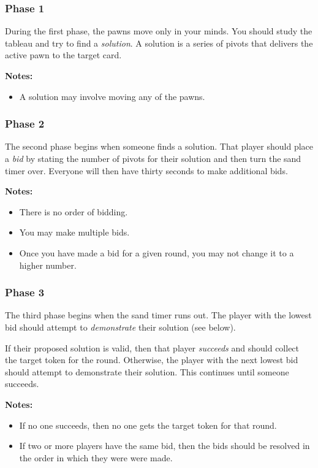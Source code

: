 \documentclass[a6paper, parskip=half, DIV=14, 10pt]{scrartcl}
\begin{document}
\subsubsection*{Phase 1}
During the first phase, the pawns move only in your minds. You should study the tableau and try to find a \emph{solution}. A solution is a series of pivots that delivers the active pawn to the target card.

\textbf{Notes:}
\begin{itemize}[leftmargin=*]
  \item A solution may involve moving any of the pawns.
\end{itemize}

\subsubsection*{Phase 2}
The second phase begins when someone finds a solution.
That player should place a \emph{bid} by stating the number of pivots for their solution and then turn the sand timer over.
Everyone will then have thirty seconds to make additional bids.

\textbf{Notes:}
  \begin{itemize}[leftmargin=*]
    \item There is no order of bidding.
    \item You may make multiple bids.
    \item Once you have made a bid for a given round, you may not change it to a higher number.   
  \end{itemize}

\newpage

\subsubsection*{Phase 3}
The third phase begins when the sand timer runs out. The player with the lowest bid should attempt to \emph{demonstrate} their solution (see below).

If their proposed solution is valid, then that player \emph{succeeds} and should collect the target token for the round. Otherwise, the player with the next lowest bid should attempt to demonstrate their solution. This continues until someone succeeds.

\textbf{Notes:}
  \begin{itemize}[leftmargin=*]
  \item If no one succeeds, then no one gets the target token for that round.
  \item If two or more players have the same bid, then the bids should be resolved in the order in which they were were made.
  \end{itemize}
\end{document}
